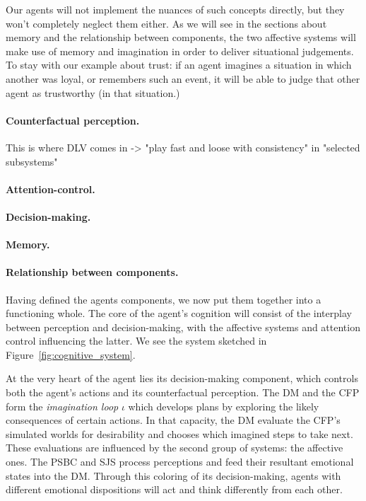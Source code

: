 Our agents will not implement the nuances of such concepts directly, but they won't completely neglect them either. As we will see in the sections about memory and the relationship between components, the two affective systems will make use of memory and imagination in order to deliver situational judgements. To stay with our example about trust: if an agent imagines a situation in which another was loyal, or remembers such an event, it will be able to judge that other agent as trustworthy (in that situation.)

\paragraph{Counterfactual perception.}

This is where DLV comes in -> "play fast and loose with consistency" in "selected subsystems"

\paragraph{Attention-control.}

\paragraph{Decision-making.}

\paragraph{Memory.}

\paragraph{Relationship between components.} Having defined the agents components, we now put them together into a functioning whole. The core of the agent's cognition will consist of the interplay between perception and decision-making, with the affective systems and attention control influencing the latter. We see the system sketched in Figure~\ref{fig:cognitive_system}.

At the very heart of the agent lies its decision-making component, which controls both the agent's actions and its counterfactual perception. The DM and the CFP form the {\em imagination loop} $\iota$ which develops plans by exploring the likely consequences of certain actions. In that capacity, the DM evaluate the CFP's simulated worlds for desirability and chooses which imagined steps to take next. These evaluations are influenced by the second group of systems: the affective ones. The PSBC and SJS process perceptions and feed their resultant emotional states into the DM. Through this coloring of its decision-making, agents with different emotional dispositions will act and think differently from each other.

